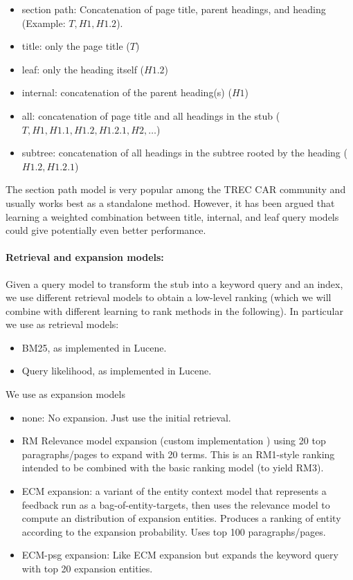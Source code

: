 \documentclass{article}
\begin{document}
\begin{itemize}
    \item section path: Concatenation of page title, parent headings, and heading (Example: $T,H1,H1.2$).
    \item title: only the page title ($T$)
    \item leaf: only the heading itself ($H1.2$)
    \item internal: concatenation of the parent heading(s) ($H1$)
    \item all: concatenation of page title and all headings in the stub ($T,H1,H1.1,H1.2, H1.2.1,H2,\dots$)
    \item subtree: concatenation of all headings in the subtree rooted by the heading ($H1.2, H1.2.1$)
\end{itemize}

The section path model is very popular among the TREC CAR community and usually works best as a standalone method. However, it has been argued that learning a weighted combination between title, internal, and leaf query models could give potentially even better performance.


\paragraph{Retrieval and expansion models:}

Given a query model to transform the stub into a keyword query and an index, we  use different retrieval models to obtain a low-level ranking (which we will combine with different learning to rank methods in the following). In particular we use as retrieval models:

\begin{itemize}
    \item BM25, as implemented in Lucene.
    \item Query likelihood, as implemented in Lucene.
\end{itemize}

We use as expansion models    
\begin{itemize}
    \item none: No expansion. Just use the initial retrieval.
    \item RM Relevance model expansion (custom implementation \cite{lavrenko2017relevance}) using 20 top paragraphs/pages to expand with 20 terms. This is an RM1-style ranking intended to be combined with the basic ranking model (to yield RM3).
    \item ECM expansion: a variant of the entity context model \cite{dalton2014entity} that represents a feedback run as a bag-of-entity-targets, then uses the relevance model to compute an distribution of expansion entities. Produces a ranking of entity according to the expansion probability. Uses top 100 paragraphs/pages.
    \item ECM-psg expansion: Like ECM expansion but expands the keyword query with top 20 expansion entities.
\end{itemize}
\end{document}
